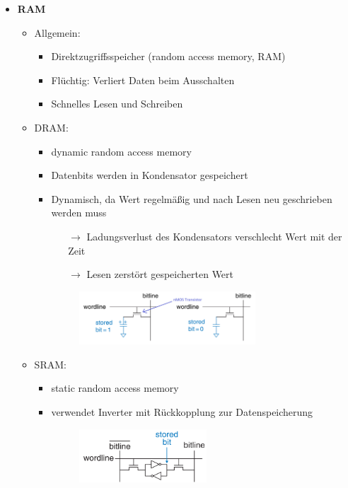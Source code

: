 \documentclass[11pt,a4paper]{article}
\begin{document}
\begin{itemize}
\item \textbf{RAM}
	\begin{itemize}
	\item Allgemein:
		\begin{itemize}
		\item Direktzugriffsspeicher (random access memory, RAM)
		\item Flüchtig: Verliert Daten beim Ausschalten
		\item Schnelles Lesen und Schreiben
		\end{itemize}
	\item DRAM:
		\begin{itemize}
		\item dynamic random access memory
		\item Datenbits werden in Kondensator gespeichert
		\item Dynamisch, da Wert regelmäßig und nach Lesen neu geschrieben werden muss
			\begin{itemize}
			\item[$\rightarrow$] Ladungsverlust des Kondensators verschlecht Wert mit der Zeit
			\item[$\rightarrow$] Lesen zerstört gespeicherten Wert
			\end{itemize}
		\item[]
			\begin{figure}[H]
			\begin{center}
			\includegraphics[height=2cm]{dram}
			\end{center}
			\end{figure}
		\end{itemize}
		
	\item SRAM:
		\begin{itemize}
		\item static random access memory
		\item verwendet Inverter mit Rückkopplung zur Datenspeicherung
		\item[]
			\begin{figure}[H]
			\begin{center}
			\includegraphics[height=2cm]{sram}
			\end{center}
			\end{figure}
		\end{itemize}
	\end{itemize}
	

\end{itemize}
\end{document}
